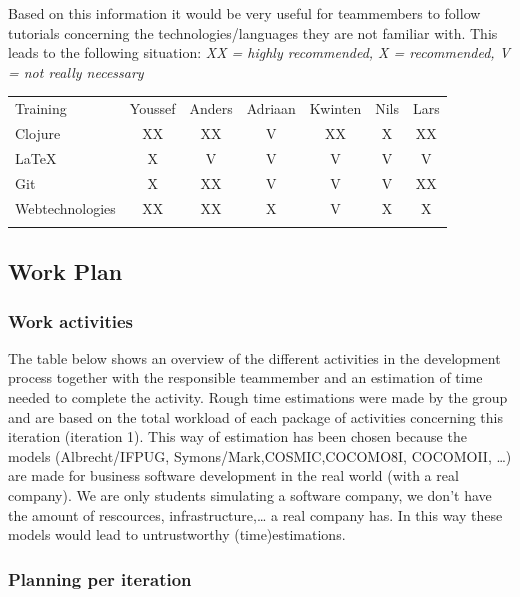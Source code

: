 \documentclass[12pt]{article}
\begin{document}
Based on this information it would be very useful for teammembers to
follow tutorials concerning the technologies/languages they are not
familiar with. This leads to the following situation: \emph{XX = highly
recommended, X = recommended, V = not really necessary}

\begin{longtable}[c]{@{}lcccccc@{}}
\hline\noalign{\medskip}
Training & Youssef & Anders & Adriaan & Kwinten & Nils & Lars
\\\noalign{\medskip}
\hline\noalign{\medskip}
Clojure & XX & XX & V & XX & X & XX
\\\noalign{\medskip}
LaTeX & X & V & V & V & V & V
\\\noalign{\medskip}
Git & X & XX & V & V & V & XX
\\\noalign{\medskip}
Webtechnologies & XX & XX & X & V & X & X
\\\noalign{\medskip}
\hline
\end{longtable}

\subsection{Work Plan}\label{work-plan}

\subsubsection{Work activities}\label{work-activities}

The table below shows an overview of the different activities in the
development process together with the responsible teammember and an
estimation of time needed to complete the activity. Rough time
estimations were made by the group and are based on the total workload
of each package of activities concerning this iteration (iteration 1).
This way of estimation has been chosen because the models
(Albrecht/IFPUG, Symons/Mark,COSMIC,COCOMO8I, COCOMOII, \ldots{}) are
made for business software development in the real world (with a real
company). We are only students simulating a software company, we don't
have the amount of rescources, infrastructure,\ldots{} a real company
has. In this way these models would lead to untrustworthy
(time)estimations.

\subsubsection{Planning per iteration}\label{planning-per-iteration}
\end{document}
